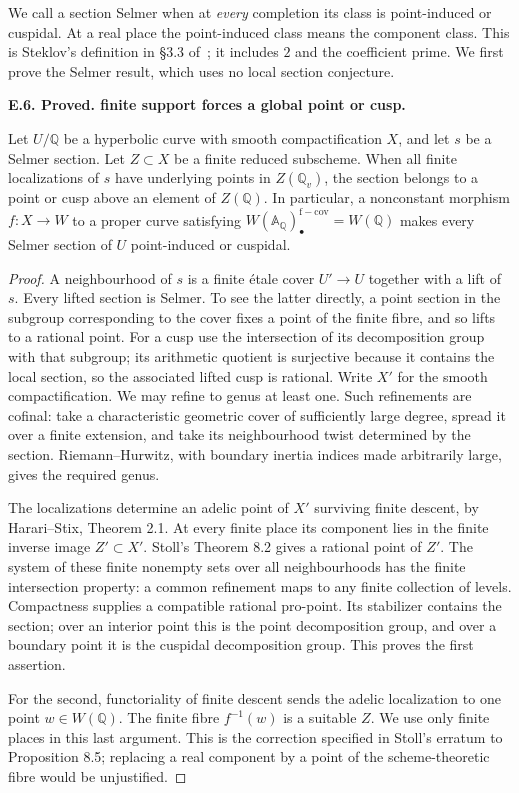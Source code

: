\documentclass[11pt,oneside]{article}
\makeatletter
\newcounter{statementanchor}
\newenvironment{statement}[3]{%
 \refstepcounter{statementanchor}\def\@currentlabel{#1}%
 \par\addvspace{9pt}\noindent
 \textbf{#1. #2. #3.}\par\nobreak\noindent\ignorespaces
}{\par\addvspace{5pt}}
\makeatother
\begin{document}
We call a section Selmer when at \emph{every} completion
its class is point-induced or cuspidal. At a real
place the point-induced class means the component
class. This is Steklov's definition in \S3.3
of~\cite{Steklov2026}; it includes $2$ and the
coefficient prime. We first prove the Selmer result,
which uses no local section conjecture.

\begin{statement}{E.6}{Proved}{finite support forces a global point or cusp}
\label{st:E.6}
\label{E-finite-support}
Let $U/\mathbb Q$ be a hyperbolic curve with smooth
compactification $X$, and let $s$ be a Selmer section.
Let $Z\subset X$ be a finite reduced subscheme.
When all finite localizations of $s$ have underlying
points in $Z(\mathbb Q_v)$, the section belongs to
a point or cusp above an element of $Z(\mathbb Q)$.
In particular, a nonconstant morphism
$f:X\to W$ to a proper curve satisfying
$W(\mathbb A_{\mathbb Q})_\bullet^{\mathrm{f-cov}}=W(\mathbb Q)$
makes every Selmer section of $U$ point-induced or cuspidal.
\end{statement}
\begin{proof}
A neighbourhood of $s$ is a finite étale cover
$U'\to U$ together with a lift of $s$.
Every lifted section is Selmer. To see the latter
directly, a point section in the subgroup corresponding
to the cover fixes a point of the finite fibre,
and so lifts to a rational point. For a cusp use the
intersection of its decomposition group with that
subgroup; its arithmetic quotient is surjective
because it contains the local section, so the
associated lifted cusp is rational.
Write $X'$ for the smooth compactification. We may
refine to genus at least one. Such refinements are
cofinal: take a characteristic geometric cover of
sufficiently large degree, spread it over a finite
extension, and take its neighbourhood twist determined
by the section. Riemann--Hurwitz, with boundary
inertia indices made arbitrarily large, gives the
required genus.

The localizations determine an adelic point of $X'$
surviving finite descent, by Harari--Stix,
Theorem 2.1. At every finite place its component
lies in the finite inverse image $Z'\subset X'$.
Stoll's Theorem 8.2 gives a rational point of $Z'$.
The system of these finite nonempty sets over all
neighbourhoods has the finite intersection property:
a common refinement maps to any finite collection
of levels. Compactness supplies a compatible
rational pro-point. Its stabilizer contains the
section; over an interior point this is the point
decomposition group, and over a boundary point it
is the cuspidal decomposition group. This proves
the first assertion.

For the second, functoriality of finite descent
sends the adelic localization to one point
$w\in W(\mathbb Q)$. The finite fibre $f^{-1}(w)$
is a suitable $Z$.
We use only finite places in this last argument.
This is the correction specified in Stoll's erratum
to Proposition 8.5; replacing a real component by
a point of the scheme-theoretic fibre would be
unjustified.
\end{proof}
\end{document}
